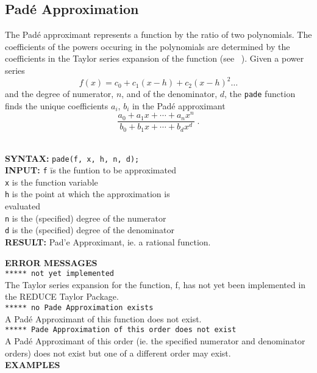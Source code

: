 \subsection{Pad\'{e} Approximation}

The Pad\'{e} approximant represents a function by the ratio of two 
polynomials. The coefficients of the powers occuring in the polynomials 
are determined by the coefficients in the Taylor series
expansion of the function (see ~\cite{PA}). Given a power series
\[ f(x) = c_0 + c_1 (x-h) + c_2 (x-h)^2 \ldots \]
and the degree of numerator, $n$, and of the denominator, $d$,
the \texttt{pade} function finds the unique coefficients 
$a_i,\, b_i$ in the Pad\'{e} approximant 
\[ \frac{a_0+a_1 x+ \cdots + a_n x^n}{b_0+b_1 x+ \cdots + b_d x^d} \; .\]
\\[\baselineskip]
%
\hypertarget{PADE:operator}{}
\begin{tabbing}
\textbf{SYNTAX:} \hspace{5mm}\= \texttt{pade(f, x, h, n, d);}\\[\baselineskip]

\textbf{INPUT:}
\> \texttt{f} \hspace{3mm} \= is the funtion to be approximated\\
\> \texttt{x}             \> is the function variable\\
\> \texttt{h}             \> is the point at which the approximation is\\ 
\>                     \> evaluated\\
\> \texttt{n}             \> is the (specified) degree of the numerator\\
\> \texttt{d}             \> is the (specified) degree of the denominator\\[\baselineskip]


\textbf{RESULT:} 
\> Pad\a'{e} Approximant, ie. a rational function.\\[\baselineskip]
\end{tabbing}


\textbf{ERROR MESSAGES}\\
%
\texttt{***** not yet implemented}\\
%
The Taylor series expansion for the function, f, has not yet
been implemented in the {\small REDUCE} Taylor Package.\\[\baselineskip]
%
%
\texttt{***** no Pade Approximation exists}\\
%
A Pad\'{e} Approximant of this function does not exist.\\[\baselineskip]
%
\texttt{***** Pade Approximation of this order does not exist}\\
%
A Pad\'{e} Approximant of this order (ie. the specified
numerator and denominator orders) does not exist but one
of a different order may exist.\\[\baselineskip]
%
%
\large{\textbf{EXAMPLES}}

